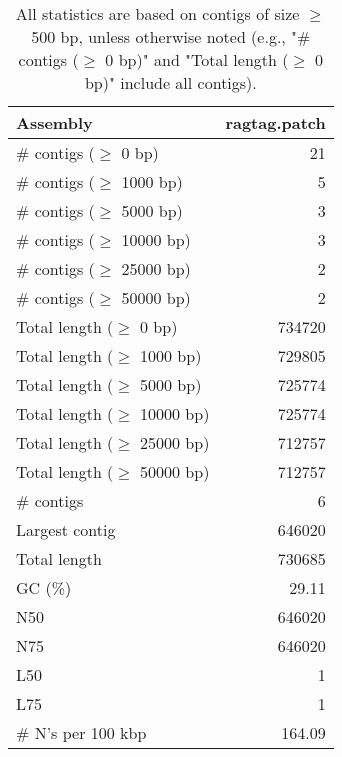 \documentclass[12pt,a4paper]{article}
\begin{document}
\begin{table}[ht]
\begin{center}
\caption{All statistics are based on contigs of size $\geq$ 500 bp, unless otherwise noted (e.g., "\# contigs ($\geq$ 0 bp)" and "Total length ($\geq$ 0 bp)" include all contigs).}
\begin{tabular}{|l*{1}{|r}|}
\hline
Assembly & ragtag.patch \\ \hline
\# contigs ($\geq$ 0 bp) & 21 \\ \hline
\# contigs ($\geq$ 1000 bp) & 5 \\ \hline
\# contigs ($\geq$ 5000 bp) & 3 \\ \hline
\# contigs ($\geq$ 10000 bp) & 3 \\ \hline
\# contigs ($\geq$ 25000 bp) & 2 \\ \hline
\# contigs ($\geq$ 50000 bp) & 2 \\ \hline
Total length ($\geq$ 0 bp) & 734720 \\ \hline
Total length ($\geq$ 1000 bp) & 729805 \\ \hline
Total length ($\geq$ 5000 bp) & 725774 \\ \hline
Total length ($\geq$ 10000 bp) & 725774 \\ \hline
Total length ($\geq$ 25000 bp) & 712757 \\ \hline
Total length ($\geq$ 50000 bp) & 712757 \\ \hline
\# contigs & 6 \\ \hline
Largest contig & 646020 \\ \hline
Total length & 730685 \\ \hline
GC (\%) & 29.11 \\ \hline
N50 & 646020 \\ \hline
N75 & 646020 \\ \hline
L50 & 1 \\ \hline
L75 & 1 \\ \hline
\# N's per 100 kbp & 164.09 \\ \hline
\end{tabular}
\end{center}
\end{table}
\end{document}
